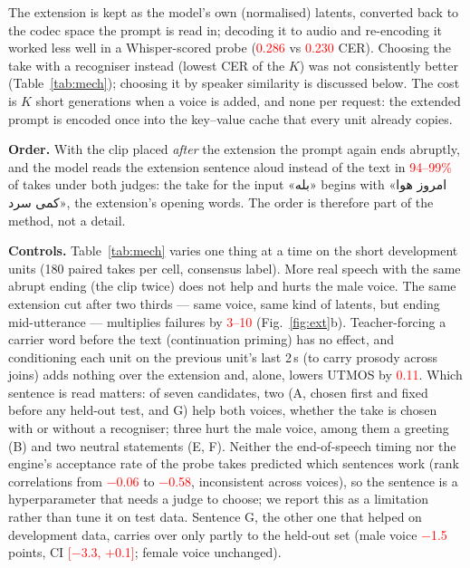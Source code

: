 \documentclass[conference]{IEEEtran}
\newcommand{\fa}[1]{{\persianfont\beginR #1\endR}}
\newcommand{\RES}[1]{\textcolor{red}{#1}}
\begin{document}
The extension is kept as the model's own (normalised) latents, converted back to the codec space the
prompt is read in; decoding it to audio and re-encoding it worked less well in a Whisper-scored probe (\RES{0.286} vs
\RES{0.230} CER).
Choosing the take with a recogniser instead (lowest CER of the $K$) was not consistently
better (Table~\ref{tab:mech}); choosing it by speaker similarity is discussed below. The cost is $K$ short generations when a voice is added, and none per request: the extended prompt is
encoded once into the key--value cache that every unit already copies.

\textbf{Order.} With the clip placed \emph{after} the extension the prompt again ends abruptly, and the model
reads the extension sentence aloud instead of the text in \RES{94--99\%} of takes under both judges: the
take for the input \fa{«بله»} begins with \fa{«امروز هوا کمی سرد»}, the extension's opening words. The order
is therefore part of the method, not a detail.

\textbf{Controls.} Table~\ref{tab:mech} varies one thing at a time on the short development units
(180 paired takes per cell, consensus label). More real speech with the same abrupt ending (the clip twice)
does not help and hurts the male voice. The same extension cut after two thirds --- same voice, same kind of
latents, but ending mid-utterance --- multiplies failures by \RES{3--10} (Fig.~\ref{fig:ext}b). Teacher-forcing a carrier word
before the text (continuation priming) has no effect, and conditioning each unit on the previous unit's last
2\,s (to carry prosody across joins) adds nothing over the extension and, alone, lowers UTMOS by
\RES{0.11}. Which sentence is read matters: of seven candidates,
two (A, chosen first and fixed before any held-out test, and G) help both voices, whether the take is chosen
with or without a recogniser; three hurt the male voice, among them a greeting (B) and two neutral statements
(E, F). Neither the end-of-speech timing nor the engine's acceptance rate of the probe takes predicted which
sentences work (rank correlations from \RES{$-$0.06} to \RES{$-$0.58}, inconsistent across voices), so the
sentence is a hyperparameter that needs a judge to choose; we report this as a limitation rather than tune
it on test data. Sentence G, the other one that helped on development data, carries over only partly to the
held-out set (male voice \RES{$-$1.5} points, CI \RES{[$-$3.3, +0.1]}; female voice unchanged).
\end{document}

